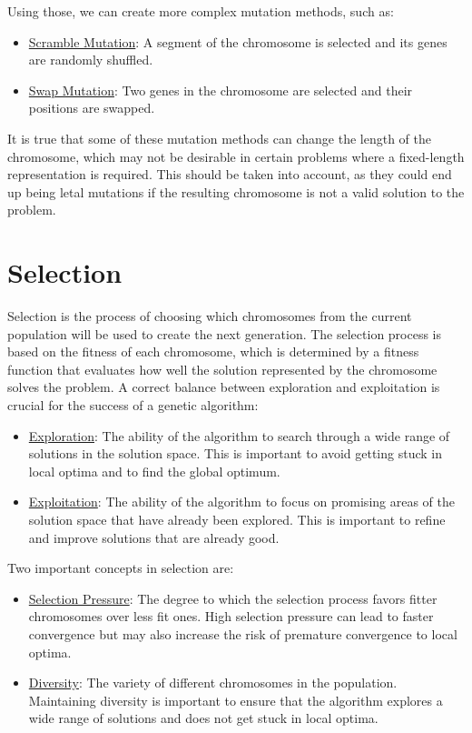 Using those, we can create more complex mutation methods, such as:
\begin{itemize}
    \item \ul{Scramble Mutation}: A segment of the chromosome is selected and its genes are randomly shuffled.
    \item \ul{Swap Mutation}: Two genes in the chromosome are selected and their positions are swapped.
\end{itemize}

It is true that some of these mutation methods can change the length of the chromosome, which may not be desirable in certain problems where a fixed-length representation is required. This should be taken into account, as they could end up being letal mutations if the resulting chromosome is not a valid solution to the problem.

\section{Selection}


Selection is the process of choosing which chromosomes from the current population will be used to create the next generation. The selection process is based on the fitness of each chromosome, which is determined by a fitness function that evaluates how well the solution represented by the chromosome solves the problem. A correct balance between exploration and exploitation is crucial for the success of a genetic algorithm:
\begin{itemize}
    \item \ul{Exploration}: The ability of the algorithm to search through a wide range of solutions in the solution space. This is important to avoid getting stuck in local optima and to find the global optimum.
    \item \ul{Exploitation}: The ability of the algorithm to focus on promising areas of the solution space that have already been explored. This is important to refine and improve solutions that are already good.
\end{itemize}

Two important concepts in selection are:
\begin{itemize}
    \item \ul{Selection Pressure}: The degree to which the selection process favors fitter chromosomes over less fit ones. High selection pressure can lead to faster convergence but may also increase the risk of premature convergence to local optima.
    \item \ul{Diversity}: The variety of different chromosomes in the population. Maintaining diversity is important to ensure that the algorithm explores a wide range of solutions and does not get stuck in local optima.
\end{itemize}

